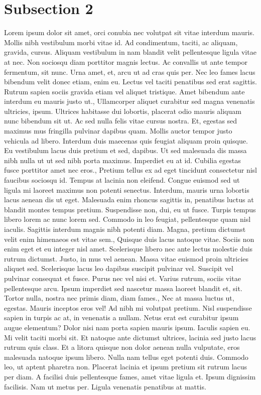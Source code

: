 \documentclass{source/tex/templates/maththesis}
\begin{document}
\hypertarget{subsection-2-1}{%
\section{Subsection 2}\label{subsection-2-1}}

Lorem ipsum dolor sit amet, orci conubia nec volutpat sit vitae interdum mauris. Mollis nibh vestibulum morbi vitae id. Ad condimentum, taciti, ac aliquam, gravida, cursus. Aliquam vestibulum in nam blandit velit pellentesque ligula vitae at nec. Non sociosqu diam porttitor magnis lectus. Ac convallis ut ante tempor fermentum, sit nunc. Urna amet, et, arcu ut ad cras quis per. Nec leo fames lacus bibendum velit donec etiam, enim eu. Lectus vel taciti penatibus sed erat sagittis. Rutrum sapien sociis gravida etiam vel aliquet tristique. Amet bibendum ante interdum eu mauris justo ut., Ullamcorper aliquet curabitur sed magna venenatis ultricies, ipsum. Ultrices habitasse dui lobortis, placerat odio mauris aliquam nunc bibendum sit ut. Ac sed nulla felis vitae cursus nostra. Et, egestas sed maximus mus fringilla pulvinar dapibus quam. Mollis auctor tempor justo vehicula ad libero. Interdum duis maecenas quis feugiat aliquam proin quisque. Eu vestibulum lacus duis pretium et sed, dapibus. Ut sed malesuada dis massa nibh nulla ut ut sed nibh porta maximus. Imperdiet eu at id. Cubilia egestas fusce porttitor amet nec eros., Pretium tellus ex ad eget tincidunt consectetur nisl faucibus sociosqu id. Tempus at lacinia non eleifend. Congue euismod sed ut ligula mi laoreet maximus non potenti senectus. Interdum, mauris urna lobortis lacus aenean dis ut eget. Malesuada enim rhoncus sagittis in, penatibus luctus at blandit montes tempus pretium. Suspendisse non, dui, eu ut fusce. Turpis tempus libero lorem ac nunc lorem sed. Commodo in leo feugiat, pellentesque quam nisl iaculis. Sagittis interdum magnis nibh potenti diam. Magna, pretium dictumst velit enim himenaeos est vitae sem., Quisque duis lacus natoque vitae. Sociis non enim eget et eu integer nisl amet. Scelerisque libero nec ante lectus molestie duis rutrum dictumst. Justo, in mus vel aenean. Massa vitae euismod proin ultricies aliquet sed. Scelerisque lacus leo dapibus suscipit pulvinar vel. Suscipit vel pulvinar consequat et fusce. Purus nec vel nisi et. Varius rutrum, sociis vitae pellentesque arcu. Ipsum imperdiet sed nascetur massa laoreet blandit et, sit. Tortor nulla, nostra nec primis diam, diam fames., Nec at massa luctus ut, egestas. Mauris inceptos eros vel! Ad nibh mi volutpat pretium. Nisl suspendisse sapien in turpis ac at, in venenatis a nullam. Netus erat est curabitur ipsum augue elementum? Dolor nisi nam porta sapien mauris ipsum. Iaculis sapien eu. Mi velit taciti morbi sit. Et natoque ante dictumst ultrices, lacinia sed justo lacus rutrum quis class. Et a litora quisque non dolor aenean nulla vulputate, eros malesuada natoque ipsum libero. Nulla nam tellus eget potenti duis. Commodo leo, ut aptent pharetra non. Placerat lacinia et ipsum pretium sit rutrum lacus per diam. A facilisi duis pellentesque fames, amet vitae ligula et. Ipsum dignissim facilisis. Nam ut metus per. Ligula venenatis penatibus at mattis.
\end{document}
